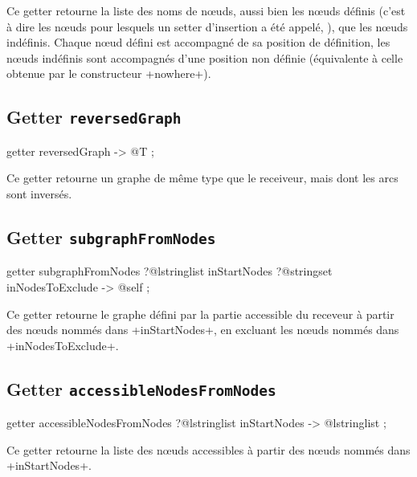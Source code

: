 Ce getter retourne la liste des noms de nœuds, aussi bien les nœuds définis (c'est à dire les nœuds pour lesquels un setter d'insertion a été appelé, ), que les nœuds indéfinis. Chaque nœud défini est accompagné de sa position de définition, les nœuds indéfinis sont accompagnés d'une position non définie (équivalente à celle obtenue par le constructeur \ggs+nowhere+).



\subsection{Getter \texttt{reversedGraph}}

\begin{galgascode}
getter reversedGraph -> @T ;
\end{galgascode}

Ce getter retourne un graphe de même type que le receiveur, mais dont les arcs sont inversés.





\subsection{Getter \texttt{subgraphFromNodes}}

\begin{galgascode}
getter subgraphFromNodes
  ?@lstringlist inStartNodes
  ?@stringset inNodesToExclude
  -> @self ;
\end{galgascode}

Ce getter retourne le graphe défini par la partie accessible du receveur à partir des nœuds nommés dans \ggs+inStartNodes+, en excluant les nœuds nommés dans \ggs+inNodesToExclude+.






\subsection{Getter \texttt{accessibleNodesFromNodes}}

\begin{galgascode}
getter accessibleNodesFromNodes
  ?@lstringlist inStartNodes
  -> @lstringlist ;
\end{galgascode}

Ce getter retourne la liste des nœuds accessibles à partir des nœuds nommés dans \ggs+inStartNodes+.






